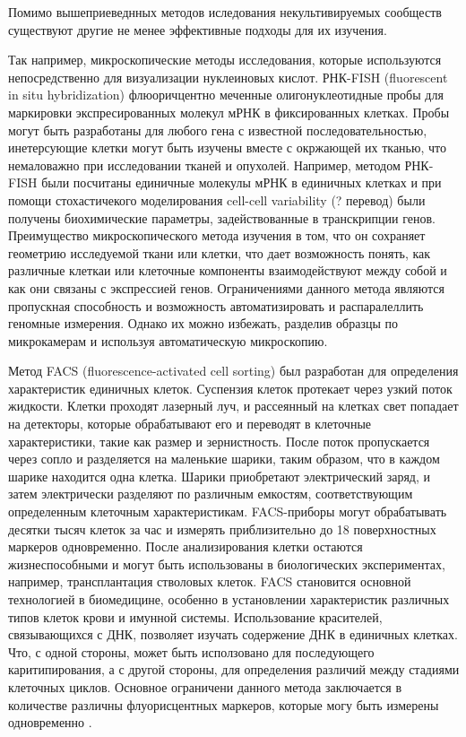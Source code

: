 Помимо вышеприеведнных методов иследования некультивируемых сообществ существуют другие не менее эффективные подходы для их изучения.

Так например, микроскопические методы исследования, которые используются непосредственно для визуализации нуклеиновых кислот. РНК-FISH (fluorescent in situ hybridization)
флюоричцентно меченные олигонуклеотидные пробы для маркировки экспресированных молекул мРНК в фиксированных клетках. Пробы могут быть разработаны для любого гена с
известной последовательностью, инетерсующие клетки могут быть изучены вместе с окржающей их тканью, что немаловажно при исследовании тканей и опухолей. Например, методом
РНК-FISH были посчитаны единичные молекулы мРНК в единичных клетках и при помощи
стохастичекого моделирования cell-cell variability (? перевод) были получены биохимические
параметры, задействованные в транскрипции генов. Преимущество микроскопического метода изучения в том, что он сохраняет геометрию исследуемой ткани или клетки, что дает
возможность понять, как различные клеткаи или клеточные компоненты взаимодействуют
между собой и как они связаны с экспрессией генов. Ограничениями данного метода являются пропускная способность и возможность автоматизировать и распаралеллить геномные
измерения. Однако их можно избежать, разделив образцы по микрокамерам и используя
автоматическую микроскопию.

Метод FACS (fluorescence-activated cell sorting) был разработан для определения характеристик единичных клеток. Суспензия клеток протекает через узкий поток жидкости. Клетки
проходят лазерный луч, и рассеянный на клетках свет попадает на детекторы, которые обрабатывают его и переводят в клеточные характеристики, такие как размер и зернистность.
После поток пропускается через сопло и разделяется на маленькие шарики, таким образом,
что в каждом шарике находится одна клетка. Шарики приобретают электрический заряд,
и затем электрически разделяют по различным емкостям, соответствующим определенным
клеточным характеристикам. FACS-приборы могут обрабатывать десятки тысяч клеток за
час и измерять приблизительно до 18 поверхностных маркеров одновременно. После анализирования клетки остаются жизнеспособными и могут быть использованы в биологических
экспериментах, например, трансплантация стволовых клеток. FACS становится основной технологией в биомедицине, особенно в установлении характеристик различных типов клеток
крови и имунной системы. Использование красителей, связывающихся с ДНК, позволяет
изучать содержение ДНК в единичных клетках. Что, с одной стороны, может быть исползовано для последующего каритипирования, а с другой стороны, для определения различий
между стадиями клеточных циклов. Основное ограничени данного метода заключается в
количестве различны флуорисцентных маркеров, которые могу быть измерены одновременно \cite{Kalisky2014}.

